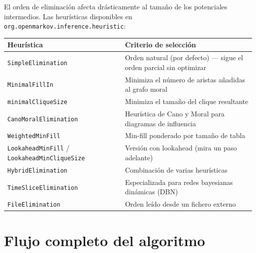 \documentclass[11pt,a4paper]{article}
\newcommand{\clase}[1]{\texttt{#1}}
\newcommand{\paquete}[1]{\texttt{#1}}
\begin{document}
El orden de eliminaci\'{o}n afecta dr\'{a}sticamente al tama\~{n}o de los
potenciales intermedios. Las heur\'{i}sticas disponibles en
\paquete{org.openmarkov.inference.heuristic}:

\begin{longtable}{p{5cm} p{9.5cm}}
\toprule
\textbf{Heur\'{i}stica} & \textbf{Criterio de selecci\'{o}n} \\
\midrule
\endhead

\clase{SimpleElimination} &
  Orden natural (por defecto) --- sigue el orden parcial sin optimizar \\
\addlinespace

\clase{MinimalFillIn} &
  Minimiza el n\'{u}mero de aristas a\~{n}adidas al grafo moral \\
\addlinespace

\clase{minimalCliqueSize} &
  Minimiza el tama\~{n}o del clique resultante \\
\addlinespace

\clase{CanoMoralElimination} &
  Heur\'{i}stica de Cano y Moral para diagramas de influencia \\
\addlinespace

\clase{WeightedMinFill} &
  Min-fill ponderado por tama\~{n}o de tabla \\
\addlinespace

\clase{LookaheadMinFill} / \newline \clase{LookaheadMinCliqueSize} &
  Versi\'{o}n con lookahead (mira un paso adelante) \\
\addlinespace

\clase{HybridElimination} &
  Combinaci\'{o}n de varias heur\'{i}sticas \\
\addlinespace

\clase{TimeSliceElimination} &
  Especializada para redes bayesianas din\'{a}micas (DBN) \\
\addlinespace

\clase{FileElimination} &
  Orden le\'{i}do desde un fichero externo \\
\bottomrule
\end{longtable}

\section{Flujo completo del algoritmo}
\end{document}
